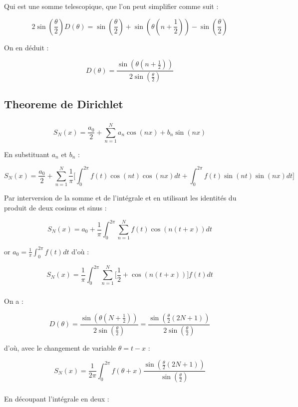 \documentclass{article}
\begin{document}
    Qui est une somme telescopique, que l'on peut simplifier comme suit :

    $$2\sin(\frac{\theta}{2}) D(\theta) = \sin(\frac{\theta}{2}) + \sin(\theta (n + \frac{1}{2})) - \sin(\frac{\theta}{2})$$

    On en déduit :

    $$D(\theta) = \frac{\sin(\theta (n + \frac{1}{2}))}{2\sin(\frac{\theta}{2})}$$

\subsection{Theoreme de Dirichlet}

\subsubsection{}
$$S_{N}(x) = \frac{a_0}{2} + \sum_{n = 1}^{N} a_n \cos(nx) + b_n \sin(nx)$$

En substituant $a_n$ et $b_n$ : 

$$S_{N}(x) = \frac{a_0}{2} + \sum_{n = 1}^{N} \frac{1}{\pi}\Big[
    \int_{0}^{2\pi} f(t) \cos(nt) \cos(nx) dt + \int_{0}^{2\pi} f(t) \sin(nt) \sin(nx) dt
\Big]$$

Par interversion de la somme et de l'intégrale et en utilisant les identités du produit de deux cosinus et sinus :

$$S_{N}(x) = a_0 + \frac{1}{\pi} \int_{0}^{2\pi} \sum_{n = 1}^{N} f(t) \cos(n (t + x)) dt$$

or $a_0 = \frac{1}{\pi} \int_{0}^{2\pi} f(t) dt$ d'où :

$$S_{N}(x) = \frac{1}{\pi} \int_{0}^{2\pi} \sum_{n = 1}^{N} \Big[\frac{1}{2} + \cos(n (t + x))\Big] f(t) dt$$

\subsubsection{}
On a :

$$D(\theta) = \frac{\sin(\theta (N + \frac{1}{2}))}{2\sin(\frac{\theta}{2})}
= \frac{\sin(\frac{\theta}{2} (2N + 1))}{2\sin(\frac{\theta}{2})}$$

d'où, avec le changement de variable $\theta = t - x$ : 

$$S_{N}(x) = \frac{1}{2\pi} \int_{0}^{2\pi} f(\theta + x) \frac{\sin(\frac{\theta}{2} (2N + 1))}{\sin(\frac{\theta}{2})}$$

\subsubsection{}
En découpant l'intégrale en deux :
\end{document}
